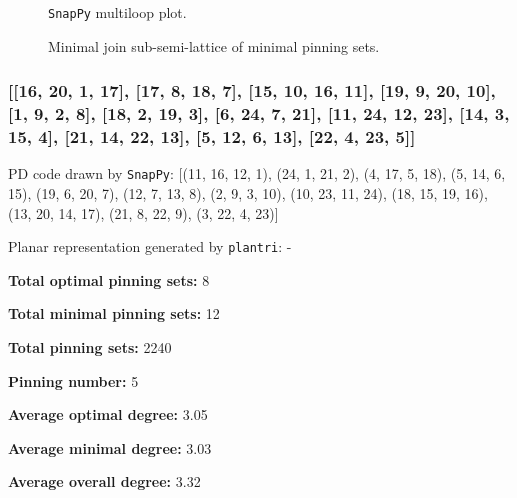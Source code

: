 \documentclass{article}%
\begin{document}
\begin{multicols}{2}
\begin{figure}[H]
\centering

\caption{\texttt{SnapPy} multiloop plot.}
\label{fig:tex/img/[[8, 12, 1, 9], [9, 13, 10, 20], [7, 15, 8, 16], [11, 14, 12, 15], [1, 14, 2, 13], [10, 2, 11, 3], [3, 19, 4, 20], [16, 21, 17, 24], [6, 23, 7, 24], [18, 22, 19, 23], [4, 22, 5, 21], [17, 5, 18, 6]].svg}
\end{figure}
\columnbreak

\begin{figure}[H]
\centering
\scalebox{0.8}{}
\caption{Minimal join sub-semi-lattice of minimal pinning sets.}
\label{fig:tex/img/[[8, 12, 1, 9], [9, 13, 10, 20], [7, 15, 8, 16], [11, 14, 12, 15], [1, 14, 2, 13], [10, 2, 11, 3], [3, 19, 4, 20], [16, 21, 17, 24], [6, 23, 7, 24], [18, 22, 19, 23], [4, 22, 5, 21], [17, 5, 18, 6]].pgf}
\end{figure}
\end{multicols}

\newpage

\subsubsection{[[16, 20, 1, 17], [17, 8, 18, 7], [15, 10, 16, 11], [19, 9, 20, 10], [1, 9, 2, 8], [18, 2, 19, 3], [6, 24, 7, 21], [11, 24, 12, 23], [14, 3, 15, 4], [21, 14, 22, 13], [5, 12, 6, 13], [22, 4, 23, 5]]}

{\small\noindent PD code drawn by \texttt{SnapPy}: [(11, 16, 12, 1), (24, 1, 21, 2), (4, 17, 5, 18), (5, 14, 6, 15), (19, 6, 20, 7), (12, 7, 13, 8), (2, 9, 3, 10), (10, 23, 11, 24), (18, 15, 19, 16), (13, 20, 14, 17), (21, 8, 22, 9), (3, 22, 4, 23)]}

{\small\noindent Planar representation generated by \texttt{plantri}: -}

\begin{multicols}{2}
{\normalsize \noindent\textbf{Total optimal pinning sets:} 8

\noindent\textbf{Total minimal pinning sets:} 12

\noindent\textbf{Total pinning sets:} 2240

\noindent\textbf{Pinning number:} 5

}
\columnbreak

{\normalsize \noindent\textbf{Average optimal degree:} 3.05

\noindent\textbf{Average minimal degree:} 3.03

\noindent\textbf{Average overall degree:} 3.32

}
\end{multicols}
\end{document}
